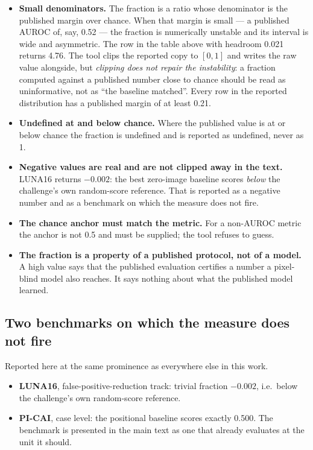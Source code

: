 \documentclass[11pt,a4paper]{article}
\begin{document}
\begin{itemize}
\item \textbf{Small denominators.} The fraction is a ratio whose denominator is the
published margin over chance. When that margin is small --- a published AUROC of, say,
0.52 --- the fraction is numerically unstable and its interval is wide and
asymmetric. The row in the table above with headroom 0.021 returns 4.76. The tool
clips the reported copy to $[0,1]$ and writes the raw value alongside, but
\emph{clipping does not repair the instability}: a fraction computed against a
published number close to chance should be read as uninformative, not as ``the
baseline matched''. Every row in the reported distribution has a published margin of
at least 0.21.
\item \textbf{Undefined at and below chance.} Where the published value is at or below
chance the fraction is undefined and is reported as undefined, never as 1.
\item \textbf{Negative values are real and are not clipped away in the text.} LUNA16
returns $-0.002$: the best zero-image baseline scores \emph{below} the challenge's own
random-score reference. That is reported as a negative number and as a benchmark on
which the measure does not fire.
\item \textbf{The chance anchor must match the metric.} For a non-AUROC metric the
anchor is not 0.5 and must be supplied; the tool refuses to guess.
\item \textbf{The fraction is a property of a published protocol, not of a model.} A
high value says that the published evaluation certifies a number a pixel-blind model
also reaches. It says nothing about what the published model learned.
\end{itemize}

\subsection{Two benchmarks on which the measure does not fire}

Reported here at the same prominence as everywhere else in this work.

\begin{itemize}
\item \textbf{LUNA16}, false-positive-reduction track: trivial fraction $-0.002$,
i.e.\ below the challenge's own random-score reference.
\item \textbf{PI-CAI}, case level: the positional baseline scores exactly 0.500. The
benchmark is presented in the main text as one that already evaluates at the unit it
should.
\end{itemize}
\end{document}
